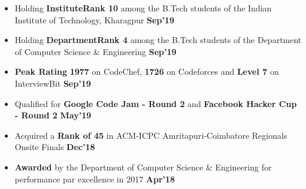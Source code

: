 \documentclass[10pt]{article}
\begin{document}
\vspace{-2ex}
\spacedhrule{0.15ex}{1.0ex}
\begin{itemize}[leftmargin=*]
\item Holding \textbf{InstituteRank 10} among the B.Tech students of the Indian Institute of Technology, Kharagpur {\hfill}\textbf{Sep'19}\\[-1.8em]
\item Holding \textbf{DepartmentRank 4} among the B.Tech students of the Department of Computer Science \& Engineering {\hfill}\textbf{Sep'19}\\[-1.8em]
\item \textbf{Peak Rating} \textbf{1977} on CodeChef, \textbf{1726} on Codeforces and \textbf{Level 7} on InterviewBit \href{https://github.com/shmundhra/Credentials/tree/master/Competitive\%20Programming/Online\%20Judges\%20Profiles} {\hspace{0.5ex}\footnotesize\faMousePointer} {\hfill}\textbf{Sep'19}\\[-1.8em]
\item Qualified for \textbf{Google Code Jam - Round 2} and \textbf{Facebook Hacker Cup - Round 2} \href{https://github.com/shmundhra/Credentials/tree/master/Competitive\%20Programming/Google\%20CodeJam} {\hspace{1ex}\footnotesize\faMousePointer} \href{https://github.com/shmundhra/Credentials/tree/master/Competitive\%20Programming/Facebook\%20Hacker\%20Cup} {\hspace{0.5ex}\footnotesize\faMousePointer} {\hfill}\textbf{May'19}\\[-1.8em]
\item Acquired a \textbf{Rank of 45} in ACM-ICPC Amritapuri-Coimbatore Regionals Onsite Finals \href{https://github.com/shmundhra/Credentials/tree/master/Competitive\%20Programming/ACM\%20ICPC\%202018} {\hspace{0.5ex}\footnotesize\faMousePointer} {\hfill}\textbf{Dec'18}\\[-1.8em]
\item \textbf{Awarded} by the Department of Computer Science \& Engineering for performance par excellence in 2017 \href{https://github.com/shmundhra/Credentials/blob/master/Academics/Student_Par_Excellence.pdf} {\hspace{0.5ex}\footnotesize\faMousePointer} {\hfill}\textbf{Apr'18}\\[-1.8em]

\end{itemize}
\end{document}
